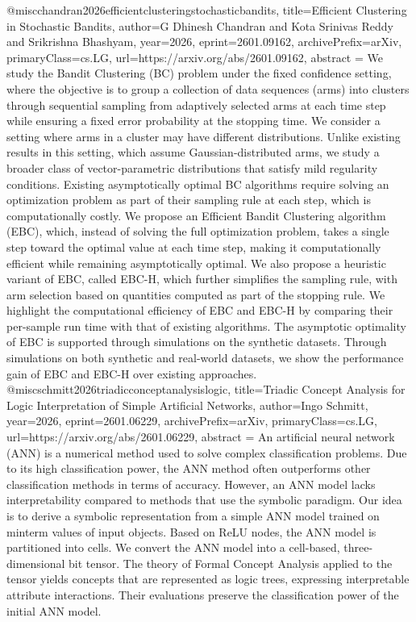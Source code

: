 {}@misc{chandran2026efficientclusteringstochasticbandits,
      title={Efficient Clustering in Stochastic Bandits}, 
      author={G Dhinesh Chandran and Kota Srinivas Reddy and Srikrishna Bhashyam},
      year={2026},
      eprint={2601.09162},
      archivePrefix={arXiv},
      primaryClass={cs.LG},
      url={https://arxiv.org/abs/2601.09162},
      abstract = {We study the Bandit Clustering (BC) problem under the fixed confidence setting, where the objective is to group a collection of data sequences (arms) into clusters through sequential sampling from adaptively selected arms at each time step while ensuring a fixed error probability at the stopping time. We consider a setting where arms in a cluster may have different distributions. Unlike existing results in this setting, which assume Gaussian-distributed arms, we study a broader class of vector-parametric distributions that satisfy mild regularity conditions. Existing asymptotically optimal BC algorithms require solving an optimization problem as part of their sampling rule at each step, which is computationally costly. We propose an Efficient Bandit Clustering algorithm (EBC), which, instead of solving the full optimization problem, takes a single step toward the optimal value at each time step, making it computationally efficient while remaining asymptotically optimal. We also propose a heuristic variant of EBC, called EBC-H, which further simplifies the sampling rule, with arm selection based on quantities computed as part of the stopping rule. We highlight the computational efficiency of EBC and EBC-H by comparing their per-sample run time with that of existing algorithms. The asymptotic optimality of EBC is supported through simulations on the synthetic datasets. Through simulations on both synthetic and real-world datasets, we show the performance gain of EBC and EBC-H over existing approaches.}
}@misc{schmitt2026triadicconceptanalysislogic,
      title={Triadic Concept Analysis for Logic Interpretation of Simple Artificial Networks}, 
      author={Ingo Schmitt},
      year={2026},
      eprint={2601.06229},
      archivePrefix={arXiv},
      primaryClass={cs.LG},
      url={https://arxiv.org/abs/2601.06229},
      abstract = {An artificial neural network (ANN) is a numerical method used to solve complex classification problems. Due to its high classification power, the ANN method often outperforms other classification methods in terms of accuracy. However, an ANN model lacks interpretability compared to methods that use the symbolic paradigm. Our idea is to derive a symbolic representation from a simple ANN model trained on minterm values of input objects. Based on ReLU nodes, the ANN model is partitioned into cells. We convert the ANN model into a cell-based, three-dimensional bit tensor. The theory of Formal Concept Analysis applied to the tensor yields concepts that are represented as logic trees, expressing interpretable attribute interactions. Their evaluations preserve the classification power of the initial ANN model.}
}
